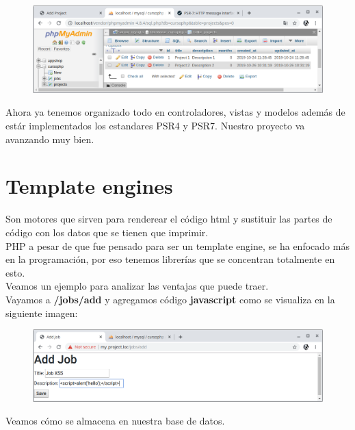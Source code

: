 \documentclass{article}
\begin{document}
\begin{figure}[h!]
  \centering
  \includegraphics[scale=0.5]{./Pictures/149_datos_almacenados_bd.png}
\end{figure}

Ahora ya tenemos organizado todo en controladores, vistas y modelos además de
estár implementados los estandares PSR4 y PSR7. Nuestro proyecto va avanzando
muy bien.\\

\newpage


\section{Template engines}%
Son motores que sirven para renderear el código html y sustituir las partes de
código con los datos que se tienen que imprimir.\\

PHP a pesar de que fue pensado para ser un template engine, se ha enfocado más
en la programación, por eso tenemos librerías que se concentran totalmente en
esto.\\

Veamos un ejemplo para analizar las ventajas que puede traer.\\

Vayamos a \textbf{/jobs/add} y agregamos código \textbf{javascript} como se
visualiza en la siguiente imagen:\\

\begin{figure}[h!]
  \centering
  \includegraphics[scale=0.5]{./Pictures/150_ataque_XSS.png}
\end{figure}

Veamos cómo se almacena en nuestra base de datos.\\
\end{document}
